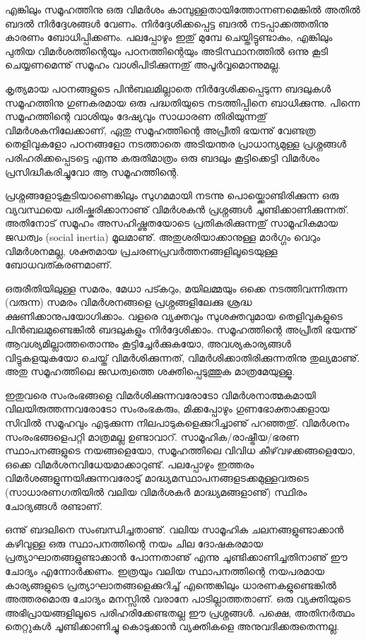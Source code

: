 എങ്കിലും സമൂഹത്തിനു ഒരു വിമര്‍ശം കാമ്പുള്ളതായിത്തോന്നണമെങ്കില്‍ അതില്‍ ബദല്‍ നിര്‍ദ്ദേശങ്ങള്‍ വേണം.
 നിര്‍ദ്ദേശിക്കപ്പെട്ട ബദല്‍ നടപ്പാക്കത്തതിനു കാരണം ബോധിപ്പിക്കണം. പലപ്പോഴും ഇതു് മുമ്പേ ചെയ്തിട്ടുണ്ടാകും, എങ്കിലും പുതിയ 
 വിമര്‍ശത്തിന്റെയും പഠനത്തിന്റെയും അടിസ്ഥാനത്തില്‍ ഒന്നു കൂടി ചെയ്യണമെന്നു് സമൂഹം വാശിപിടിക്കുന്നതു് അപൂര്‍വ്വമൊന്നുമല്ല.

കൃത്യമായ പഠനങ്ങളുടെ പിന്‍ബലമില്ലാതെ നിര്‍ദ്ദേശിക്കപ്പെടുന്ന ബദലുകള്‍ സമൂഹത്തിനു ഗുണകരമായ ഒരു പദ്ധതിയുടെ
 നടത്തിപ്പിനെ ബാധിക്കുന്നു. പിന്നെ സമൂഹത്തിന്റെ വാശിയും ദേഷ്യവും സാധാരണ തിരിയുന്നതു് വിമര്‍ശകനിലേക്കാണ്, 
 ഏതു സമൂഹത്തിന്റെ അപ്രീതി ഭയന്നു് വേണ്ടത്ര തെളിവുകളോ പഠനങ്ങളോ നടത്താതെ അടിയന്തര പ്രാധാന്യമുള്ള പ്രശ്നങ്ങള്‍ 
 പരിഹരിക്കപ്പെടട്ടെ എന്നു കരുതിമാത്രം ഒരു ബദലും കൂട്ടിക്കെട്ടി വിമര്‍ശം പ്രസിദ്ധീകരിച്ചുവോ ആ സമൂഹത്തിന്റെ.

പ്രശ്നങ്ങളോടുകൂടിയാണെങ്കിലും സുഗമമായി നടന്നു പൊയ്ക്കൊണ്ടിരിക്കുന്ന ഒരു വ്യവസ്ഥയെ പരിഷ്കരിക്കാനാണു് വിമര്‍ശകന്‍ പ്രശ്നങ്ങള്‍ 
ചൂണ്ടിക്കാണിക്കുന്നത്. അതിനോട് സമൂഹം അസഹിഷ്ണുതയോടെ പ്രതികരിക്കുന്നതു് സാമൂഹികമായ ജഡത്വം (social inertia) മൂലമാണു്. 
അതുശരിയാക്കാനുള്ള മാര്‍ഗ്ഗം വെറും വിമര്‍ശനമല്ല, ശക്തമായ പ്രചരണപ്രവര്‍ത്തനങ്ങളിലൂടെയുള്ള ബോധവത്കരണമാണ്.

ഒരുരീതിയിലുള്ള സമരം, മേധാ പട്കറും, മയിലമ്മയും ഒക്കെ നടത്തിവന്നിരുന്ന (വരുന്ന) സമരം വിമര്‍ശനങ്ങളെ പ്രശ്നങ്ങളിലേക്കു 
ശ്രദ്ധ ക്ഷണിക്കാനുപയോഗിക്കാം. വളരെ വ്യക്തവും സുശക്തവുമായ തെളിവുകളുടെ പിന്‍ബലമുണ്ടെങ്കില്‍ ബദലുകളും നിര്‍ദ്ദേശിക്കാം.
 സമൂഹത്തിന്റെ അപ്രീതി ഭയന്നു് ആവശ്യമില്ലാത്തതൊന്നും കൂട്ടിച്ചേര്‍ക്കുകയോ, അവശ്യകാര്യങ്ങള്‍ വിട്ടുകളയുകയോ ചെയ്ത് വിമര്‍ശിക്കുന്നത്, 
 വിമര്‍ശിക്കാതിരിക്കുന്നതിനു തുല്യമാണു്. അതു സമൂഹത്തിലെ ജഡത്വത്തെ ശക്തിപ്പെടുത്തുക മാത്രമേയുള്ളൂ.

ഇതുവരെ സംരംഭങ്ങളെ വിമര്‍ശിക്കുന്നവരോടോ വിമര്‍ശനാത്മകമായി വിലയിരുത്തന്നവരോടോ സംരംഭകരും, മിക്കപ്പോഴും 
ഗുണഭോക്താക്കളായ സിവില്‍ സമൂഹവും എടുക്കുന്ന നിലപാടുകളെക്കുറിച്ചാണു് പറഞ്ഞതു്. വിമര്‍ശനം സംരംഭങ്ങളെപറ്റി മാത്രമല്ല ഉണ്ടാവാറ്.
 സാമൂഹിക/രാഷ്ട്രീയ/ഭരണ സ്ഥാപനങ്ങളുടെ നയങ്ങളെയോ, സമൂഹത്തിലെ വിവിധ കീഴ്‌വഴക്കങ്ങളെയോ, ഒക്കെ വിമര്‍ശനവിധേയമാക്കാറുണ്ട്. 
 പലപ്പോഴും ഇത്തരം വിമര്‍ശങ്ങളുന്നയിക്കുന്നവരോടു് മാദ്ധ്യമസ്ഥാപനങ്ങളടക്കമുള്ളവരുടെ (സാധാരണഗതിയില്‍ വലിയ വിമര്‍ശകര്‍ മാദ്ധ്യമങ്ങളാണു്)
  സ്ഥിരം ചോദ്യങ്ങള്‍ രണ്ടാണ്.

ഒന്നു് ബദലിനെ സംബന്ധിച്ചതാണു്. വലിയ സാമൂഹിക ചലനങ്ങളുണ്ടാക്കാന്‍ കഴിവുള്ള ഒരു സ്ഥാപനത്തിന്റെ നയം ചില ദോഷകരമായ 
പ്രത്യാഘാതങ്ങളുണ്ടാക്കാന്‍ പോന്നതാണു് എന്നു ചൂണ്ടിക്കാണിച്ചതിനാണു് ഈ ചോദ്യം എന്നോര്‍ക്കണം. ഇത്രയും വലിയ സ്ഥാപനത്തിന്റെ
 നയപരമായ കാര്യങ്ങളുടെ പ്രത്യാഘാതങ്ങളെക്കുറിച്ച് എന്തെങ്കിലും ധാരണകളുണ്ടെങ്കില്‍ അത്തരമൊരു ചോദ്യം മനസ്സില്‍ വരാനേ പാടില്ലാത്തതാണ്. 
 ഒരു വ്യക്തിയുടെ അഭിപ്രായങ്ങളിലൂടെ പരിഹരിക്കേണ്ടതല്ല ഈ പ്രശ്നങ്ങള്‍. പക്ഷെ, അതിനര്‍ത്ഥം തെറ്റുകള്‍ ചൂണ്ടിക്കാണിച്ചു കൊടുക്കാന്‍ വ്യക്തികളെ അനുവദിക്കരുതെന്നല്ല.

